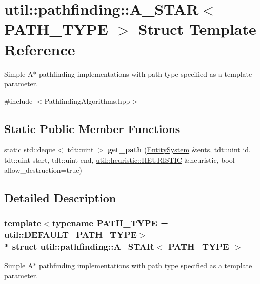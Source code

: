 \hypertarget{structutil_1_1pathfinding_1_1_a___s_t_a_r}{}\section{util\+:\+:pathfinding\+:\+:A\+\_\+\+S\+T\+AR$<$ P\+A\+T\+H\+\_\+\+T\+Y\+PE $>$ Struct Template Reference}
\label{structutil_1_1pathfinding_1_1_a___s_t_a_r}


Simple A$\ast$ pathfinding implementations with path type specified as a template parameter.  




{\ttfamily \#include $<$Pathfinding\+Algorithms.\+hpp$>$}

\subsection*{Static Public Member Functions}
\begin{DoxyCompactItemize}
\item 
static std\+::deque$<$ tdt\+::uint $>$ {\bfseries get\+\_\+path} (\hyperlink{class_entity_system}{Entity\+System} \&ents, tdt\+::uint id, tdt\+::uint start, tdt\+::uint end, \hyperlink{structutil_1_1heuristic_1_1_h_e_u_r_i_s_t_i_c}{util\+::heuristic\+::\+H\+E\+U\+R\+I\+S\+T\+IC} \&heuristic, bool allow\+\_\+destruction=true)\hypertarget{structutil_1_1pathfinding_1_1_a___s_t_a_r_a1d65df13cf40103a2dbc5abb0c5f5380}{}\label{structutil_1_1pathfinding_1_1_a___s_t_a_r_a1d65df13cf40103a2dbc5abb0c5f5380}

\end{DoxyCompactItemize}


\subsection{Detailed Description}
\subsubsection*{template$<$typename P\+A\+T\+H\+\_\+\+T\+Y\+PE = util\+::\+D\+E\+F\+A\+U\+L\+T\+\_\+\+P\+A\+T\+H\+\_\+\+T\+Y\+PE$>$\\*
struct util\+::pathfinding\+::\+A\+\_\+\+S\+T\+A\+R$<$ P\+A\+T\+H\+\_\+\+T\+Y\+P\+E $>$}

Simple A$\ast$ pathfinding implementations with path type specified as a template parameter. 



